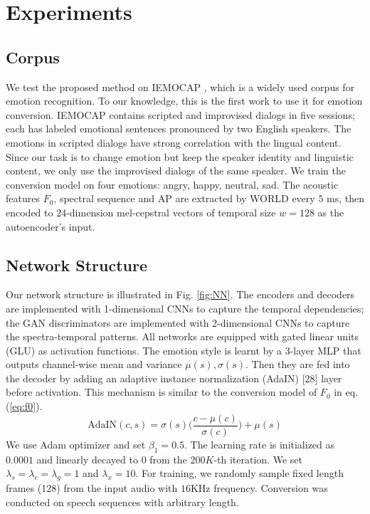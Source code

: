 \documentclass{article}
\begin{document}
\section{Experiments}
\label{sec:exp}

\subsection{Corpus}
We test the proposed method on IEMOCAP \cite{busso2008iemocap}, which is a widely used corpus for emotion recognition. To our knowledge, this is the first work to use it for emotion conversion. IEMOCAP contains scripted and improvised dialogs in five sessions; each has labeled emotional sentences pronounced by two English speakers. The emotions in scripted dialogs have strong correlation with the lingual content. Since our task is to change emotion but keep the speaker identity and linguistic content, we only use the improvised dialogs of the same speaker. We train the conversion model on four emotions: angry, happy, neutral, sad. The acoustic features $F_0$, spectral sequence and AP are extracted by WORLD \cite{morise2016world} every $5$ ms, then encoded to $24$-dimension mel-cepstral vectors of temporal size $w=128$ as the autoencoder's input.


\subsection{Network Structure}
Our network structure is illustrated in Fig. \ref{fig:NN}. The encoders and decoders are implemented with 1-dimensional CNNs to capture the temporal dependencies; the GAN discriminators are implemented with 2-dimensional CNNs to capture the spectra-temporal patterns. All networks are equipped with gated linear units (GLU) \cite{dauphin2017language} as activation functions. The emotion style is learnt by a $3$-layer MLP that outputs channel-wise mean and variance $\mu(s), \sigma(s)$. Then they are fed into the decoder by adding an adaptive instance normalization (AdaIN) [28] layer before activation. This mechanism is similar to the conversion model of $F_0$ in eq. (\ref{eq:f0}).
\begin{equation}
\text{AdaIN}(c,s) = \sigma(s)\Big(\frac{c-\mu(c)}{\sigma(c)}\Big) + \mu(s)
\end{equation}
We use Adam optimizer and set $\beta_1=0.5$. The learning rate is initialized as $0.0001$ and linearly decayed to $0$ from the $200K$-th iteration. We set $\lambda_s = \lambda_c = \lambda_g = 1$ and $\lambda_x=10$. For training, we randomly sample fixed length frames (128) from the input audio with $16$KHz frequency. Conversion was conducted on speech sequences with arbitrary length.
\end{document}
